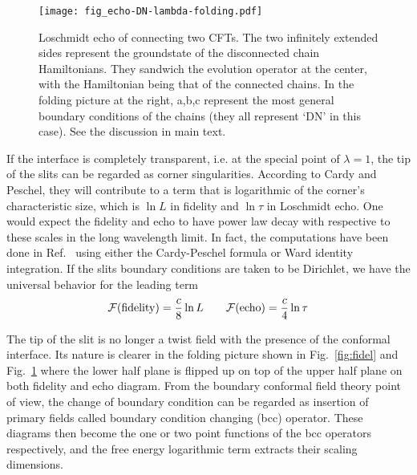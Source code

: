 \begin{figure}[h]
\centering
\texttt{[image: fig\_echo-DN-lambda-folding.pdf]}
\caption{Loschmidt echo of connecting two CFTs. The two infinitely extended sides represent the groundstate of the disconnected chain Hamiltonians. They sandwich the evolution operator at the center, with the Hamiltonian being that of the connected chains. In the folding picture at the right, a,b,c represent the most general boundary conditions of the chains (they all represent `DN' in this case). See the discussion in main text.}
\label{fig:echo}
\end{figure}

If the interface is completely transparent, i.e. at the special point of $\lambda = 1$, the tip of the slits can be regarded as corner singularities. According to Cardy and Peschel\cite{cardy_finite-size_1988}, they will contribute to a term that is logarithmic of the corner's characteristic size, which is $\ln L$ in fidelity and $\ln \tau$ in Loschmidt echo. One would expect the fidelity and echo to have power law decay with respective to these scales in the long wavelength limit. In fact, the computations have been done in Ref.~ using either the Cardy-Peschel formula or Ward identity integration. If the slits boundary conditions are taken to be Dirichlet, we have the universal behavior for the leading term \cite{stephan_logarithmic_2013,stephan_local_2011}
\begin{equation}
\label{eq:full-pass}
\mathcal{F}({\rm fidelity}) =  \frac{c}{8} \ln L \qquad \mathcal{F}( {\rm echo} )  = \frac{c}{4} \ln \tau 
\end{equation}

The tip of the slit is no longer a twist field with the presence of the conformal interface. Its nature is clearer in the folding picture shown in Fig.~\ref{fig:fidel} and Fig.~\ref{fig:echo} where the lower half plane is flipped up on top of the upper half plane on both fidelity and echo diagram. From the boundary conformal field theory point of view, the change of boundary condition can be regarded as insertion of primary fields called boundary condition changing (bcc) operator. These diagrams then become the one or two point functions of the bcc operators respectively, and the free energy logarithmic term extracts their scaling dimensions. 




